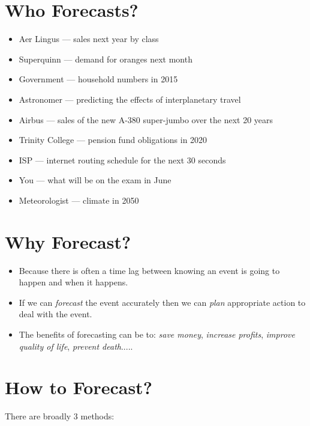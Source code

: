 \documentclass[a4paper,11pt,oneside,onecolumn]{book}
\begin{document}
\section{Who Forecasts?}
\begin{itemize}
\item Aer Lingus --- sales next year by class
\item Superquinn --- demand for oranges next month
\item Government --- household numbers in 2015
\item Astronomer --- predicting the effects of interplanetary
travel
\item Airbus --- sales of the new A-380 super-jumbo over
the next 20 years
\item Trinity College --- pension fund obligations in 2020
\item ISP --- internet routing schedule for the next 30 seconds
\item You --- what will be on the  exam in June
\item Meteorologist --- climate in 2050
\end{itemize}

\section{Why Forecast?}
\begin{itemize}
\item Because there is often a time lag between knowing an event
is going to happen and when it happens.
\item If we can {\it forecast} the event accurately then we can
{\it plan} appropriate action to deal with the event.
\item The benefits of forecasting can be to: {\it save money}, {\it increase
profits}, {\it improve quality of life}, {\it prevent death}.....
\end{itemize}


\section{How to Forecast?}

There are broadly  3 methods:
\end{document}
